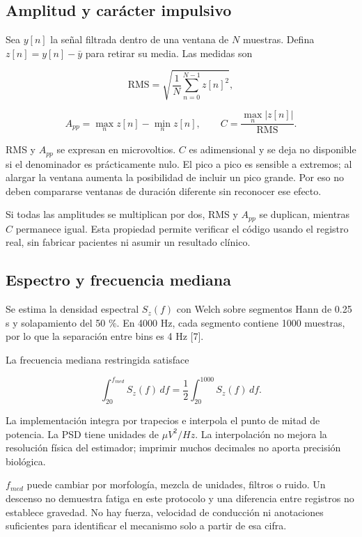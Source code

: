\documentclass[
  spanish,
  10.5pt,
  a4paper,
  DIV=11,
  numbers=noendperiod]{scrartcl}
\begin{document}
\subsection{Amplitud y carácter
impulsivo}\label{amplitud-y-caruxe1cter-impulsivo}

Sea \(y[n]\) la señal filtrada dentro de una ventana de \(N\) muestras.
Defina \(z[n]=y[n]-\bar y\) para retirar su media. Las medidas son

\[\mathrm{RMS}=\sqrt{\frac{1}{N}\sum_{n=0}^{N-1}z[n]^2},\]

\[A_{pp}=\max_n z[n]-\min_n z[n],\qquad
C=\frac{\max_n|z[n]|}{\mathrm{RMS}}.\]

RMS y \(A_{pp}\) se expresan en microvoltios. \(C\) es adimensional y se
deja no disponible si el denominador es prácticamente nulo. El pico a
pico es sensible a extremos; al alargar la ventana aumenta la
posibilidad de incluir un pico grande. Por eso no deben compararse
ventanas de duración diferente sin reconocer ese efecto.

Si todas las amplitudes se multiplican por dos, RMS y \(A_{pp}\) se
duplican, mientras \(C\) permanece igual. Esta propiedad permite
verificar el código usando el registro real, sin fabricar pacientes ni
asumir un resultado clínico.

\subsection{Espectro y frecuencia
mediana}\label{espectro-y-frecuencia-mediana}

Se estima la densidad espectral \(S_z(f)\) con Welch sobre segmentos
Hann de 0.25 s y solapamiento del 50 \%. En 4000 Hz, cada segmento
contiene 1000 muestras, por lo que la separación entre bins es 4 Hz
{[}7{]}.

La frecuencia mediana restringida satisface

\[\int_{20}^{f_{med}}S_z(f)\,df
=\frac{1}{2}\int_{20}^{1000}S_z(f)\,df.\]

La implementación integra por trapecios e interpola el punto de mitad de
potencia. La PSD tiene unidades de \(\mu V^2/Hz\). La interpolación no
mejora la resolución física del estimador; imprimir muchos decimales no
aporta precisión biológica.

\(f_{med}\) puede cambiar por morfología, mezcla de unidades, filtros o
ruido. Un descenso no demuestra fatiga en este protocolo y una
diferencia entre registros no establece gravedad. No hay fuerza,
velocidad de conducción ni anotaciones suficientes para identificar el
mecanismo solo a partir de esa cifra.
\end{document}
